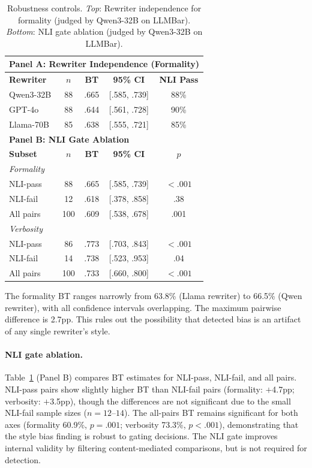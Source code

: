 \documentclass[11pt]{article}
\begin{document}
\begin{table}[t]
\centering
\small
\caption{Robustness controls. \emph{Top}: Rewriter independence for formality (judged by Qwen3-32B on LLMBar). \emph{Bottom}: NLI gate ablation (judged by Qwen3-32B on LLMBar).}
\label{tab:robustness}
\begin{tabular}{l cccc}
\toprule
\multicolumn{5}{l}{\textbf{Panel A: Rewriter Independence (Formality)}} \\
\midrule
\textbf{Rewriter} & $n$ & \textbf{BT} & \textbf{95\% CI} & \textbf{NLI Pass} \\
\midrule
Qwen3-32B  & 88  & .665 & [.585, .739] & 88\% \\
GPT-4o     & 88  & .644 & [.561, .728] & 90\% \\
Llama-70B  & 85  & .638 & [.555, .721] & 85\% \\
\midrule
\multicolumn{5}{l}{\textbf{Panel B: NLI Gate Ablation}} \\
\midrule
\textbf{Subset} & $n$ & \textbf{BT} & \textbf{95\% CI} & $p$ \\
\midrule
\multicolumn{5}{l}{\emph{Formality}} \\
\quad NLI-pass & 88  & .665 & [.585, .739] & ${<}.001$ \\
\quad NLI-fail & 12  & .618 & [.378, .858] & .38 \\
\quad All pairs & 100 & .609 & [.538, .678] & .001 \\
\midrule
\multicolumn{5}{l}{\emph{Verbosity}} \\
\quad NLI-pass & 86  & .773 & [.703, .843] & ${<}.001$ \\
\quad NLI-fail & 14  & .738 & [.523, .953] & .04 \\
\quad All pairs & 100 & .733 & [.660, .800] & ${<}.001$ \\
\bottomrule
\end{tabular}
\end{table}

The formality BT ranges narrowly from 63.8\% (Llama rewriter) to 66.5\% (Qwen rewriter), with all confidence intervals overlapping.
The maximum pairwise difference is 2.7pp.
This rules out the possibility that detected bias is an artifact of any single rewriter's style.

\paragraph{NLI gate ablation.}
Table~\ref{tab:robustness} (Panel B) compares BT estimates for NLI-pass, NLI-fail, and all pairs.
NLI-pass pairs show slightly higher BT than NLI-fail pairs (formality: $+$4.7pp; verbosity: $+$3.5pp), though the differences are not significant due to the small NLI-fail sample sizes ($n = 12$--$14$).
The all-pairs BT remains significant for both axes (formality 60.9\%, $p = .001$; verbosity 73.3\%, $p < .001$), demonstrating that the style bias finding is robust to gating decisions.
The NLI gate improves internal validity by filtering content-mediated comparisons, but is not required for detection.
\end{document}
